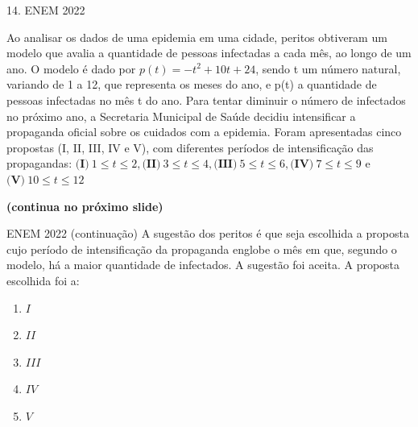 \documentclass[11pt]{beamer}
\begin{document}
\begin{frame}{14. ENEM 2022}

    Ao analisar os dados de uma epidemia em uma cidade, peritos obtiveram um modelo que avalia a quantidade de pessoas infectadas a cada mês, ao longo de um ano. O modelo é dado por $p(t)=-t^{2}+10t+24$, sendo t um número natural, variando de 1 a 12, que representa os meses do ano, e p(t) a quantidade de pessoas infectadas no mês t do ano. Para tentar diminuir o número de infectados no próximo ano, a Secretaria Municipal de Saúde decidiu intensificar a propaganda oficial sobre os cuidados com a epidemia. Foram apresentadas cinco propostas (I, II, III, IV e V), com diferentes períodos de intensificação das propagandas: $\textbf{(I)}\ 1 \leq t \leq 2, \textbf{(II)}\ 3 \leq t \leq 4, \textbf{(III)}\ 5 \leq t \leq 6, \textbf{(IV)}\ 7 \leq t \leq 9$ e $\textbf{(V)}\ 10 \leq t \leq 12$

    \vfill
    \textbf{(continua no próximo slide)}
\end{frame}
\begin{frame}{ENEM 2022 (continuação)}
    A sugestão dos peritos é que seja escolhida a proposta cujo período de intensificação da propaganda englobe o mês em que, segundo o modelo, há a maior quantidade de infectados. A sugestão foi aceita. A proposta escolhida foi a:

    \begin{enumerate}[a]
            \item $I$
            \item $II$
            \item $III$ %
            \item $IV$ 
            \item $V$
        \end{enumerate}
\end{frame}
\end{document}
